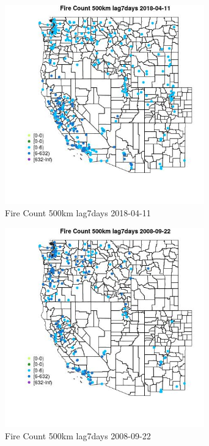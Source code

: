 \begin{figure} 
\centering  
\includegraphics[width=0.77\textwidth]{Code_Outputs/Report_ML_input_PM25_Step4_part_e_de_duplicated_aves_compiled_2019-05-18wNAs_MapObsFire_Count_500km_lag7days2018-04-11.jpg} 
\caption{\label{fig:Report_ML_input_PM25_Step4_part_e_de_duplicated_aves_compiled_2019-05-18wNAsMapObsFire_Count_500km_lag7days2018-04-11}Fire Count 500km lag7days 2018-04-11} 
\end{figure} 
 

\begin{figure} 
\centering  
\includegraphics[width=0.77\textwidth]{Code_Outputs/Report_ML_input_PM25_Step4_part_e_de_duplicated_aves_compiled_2019-05-18wNAs_MapObsFire_Count_500km_lag7days2008-09-22.jpg} 
\caption{\label{fig:Report_ML_input_PM25_Step4_part_e_de_duplicated_aves_compiled_2019-05-18wNAsMapObsFire_Count_500km_lag7days2008-09-22}Fire Count 500km lag7days 2008-09-22} 
\end{figure} 
 

